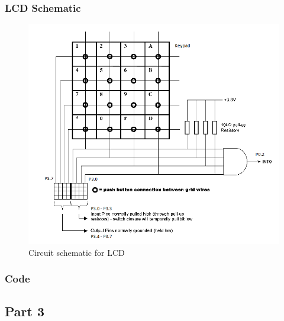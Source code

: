\documentclass[12pt]{article}
\begin{document}
\subsubsection{LCD Schematic}
\begin{figure}[H]
	\centering
	\includegraphics[width=\textwidth]{keypad_schematic.png}
	\caption{Circuit schematic for LCD}
	\label{LCD}
\end{figure}

\subsubsection{Code}
		
\subsection{Part 3}
\end{document}
